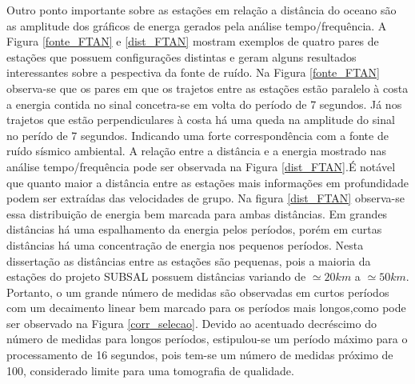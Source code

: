 Outro ponto importante sobre as estações em relação a distância do oceano são as amplitude dos gráficos de energa gerados pela análise tempo/frequência. A Figura \ref{fonte_FTAN} e \ref{dist_FTAN} mostram exemplos de quatro pares de estações que possuem configurações distintas e geram alguns resultados interessantes sobre a pespectiva da fonte de ruído. Na Figura \ref{fonte_FTAN} observa-se que os pares em que os trajetos entre as estações estão paralelo à costa a energia contida no sinal concetra-se em volta do período de 7 segundos. Já nos trajetos que estão perpendiculares à costa há uma queda na amplitude do sinal no perído de 7 segundos. Indicando uma forte correspondência com a fonte de ruído sísmico ambiental. A relação entre a distância e a energia mostrado nas análise tempo/frequência pode ser observada na Figura \ref{dist_FTAN}.É notável que quanto maior a distância entre as estações mais informações em profundidade podem ser extraídas das velocidades de grupo. Na figura \ref{dist_FTAN} observa-se essa distribuição de energia bem marcada para ambas distâncias. Em grandes distâncias há uma  espalhamento da energia pelos períodos, porém em curtas distâncias há uma concentração de energia nos pequenos períodos. Nesta dissertação as distâncias entre as estações são pequenas, pois a maioria da estações do projeto SUBSAL possuem distâncias variando de $\simeq 20 km$ a $\simeq 50 km$. Portanto, o um grande número de medidas são observadas em curtos períodos com um decaimento linear bem marcado para os períodos mais longos,como pode ser observado na Figura \ref{corr_selecao}. Devido ao acentuado decréscimo do número de medidas para longos períodos, estipulou-se um período máximo para o processamento de 16 segundos, pois tem-se um número de medidas próximo de 100, considerado limite para uma tomografia de qualidade.

